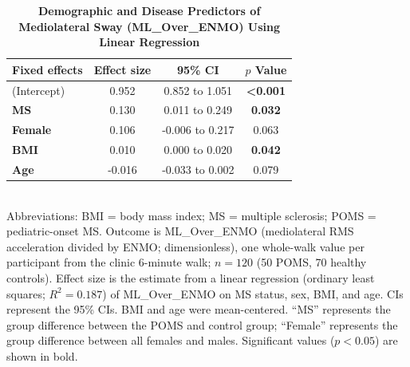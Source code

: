 \begin{table}[t]
\centering
\caption{\textbf{Demographic and Disease Predictors of Mediolateral Sway (ML\_Over\_ENMO) Using Linear Regression}}
\label{tab:ml_over_enmo_ols}
\begin{tabular}{l ccc}
\toprule
Fixed effects & Effect size & 95\% CI & $p$ Value \\
\midrule
(Intercept) & 0.952 & 0.852 to 1.051 & \textbf{\textless0.001} \\
\textbf{MS} & 0.130 & 0.011 to 0.249 & \textbf{0.032} \\
\textbf{Female} & 0.106 & -0.006 to 0.217 & 0.063 \\
\textbf{BMI} & 0.010 & 0.000 to 0.020 & \textbf{0.042} \\
\textbf{Age} & -0.016 & -0.033 to 0.002 & 0.079 \\
\bottomrule
\end{tabular}
\\[2pt]
{\footnotesize Abbreviations: BMI = body mass index; MS = multiple sclerosis; POMS = pediatric-onset MS. Outcome is ML\_Over\_ENMO (mediolateral RMS acceleration divided by ENMO; dimensionless), one whole-walk value per participant from the clinic 6-minute walk; $n=120$ (50 POMS, 70 healthy controls). Effect size is the estimate from a linear regression (ordinary least squares; $R^2=0.187$) of ML\_Over\_ENMO on MS status, sex, BMI, and age. CIs represent the 95\% CIs. BMI and age were mean-centered. ``MS'' represents the group difference between the POMS and control group; ``Female'' represents the group difference between all females and males. Significant values ($p<0.05$) are shown in bold.}
\end{table}
